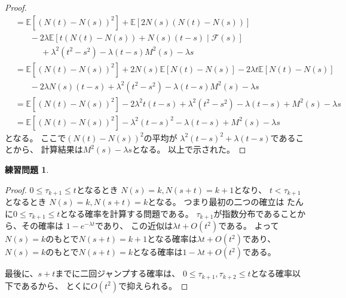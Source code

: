\documentclass[uplatex]{jsarticle}
\theoremstyle{definition}
\newtheorem{prob}[prob]{練習問題}
\def\E{\mathbb{E}}
\def\mcF{\mathcal{F}}
\begin{document}
\begin{proof}
\begin{align*}
    &= \E\left[ \left( N(t) - N(s)\right)^2\right]
    + \E\left[ 2N(s)\left( N(t) - N(s) \right)\right] \\
    &\ \ \ \ \ \ \ \
    - 2\lambda \E\left[ t(N(t)-N(s)) + N(s)(t-s) \middle| \mcF(s) \right] \\
    &\ \ \ \ \ \ \ \ \ \ \ \ \ \
    + \lambda^2(t^2-s^2) - \lambda (t-s) M^2(s) - \lambda s \\
    &= \E\left[ \left( N(t) - N(s)\right)^2\right]
    + 2N(s)\E\left[ N(t) - N(s) \right]
    - 2\lambda t\E\left[ N(t) - N(s) \right] \\
    &\ \ \ \ \ \ \ \
    - 2\lambda N(s)(t-s) + \lambda^2(t^2-s^2)
    - \lambda (t-s) M^2(s) - \lambda s \\
    &= \E\left[ \left( N(t) - N(s)\right)^2\right]
    - 2\lambda^2 t(t-s) + \lambda^2(t^2-s^2) - \lambda (t-s) + M^2(s) - \lambda s \\
    &= \E\left[ \left( N(t) - N(s)\right)^2\right]
    - \lambda^2(t-s)^2 - \lambda (t-s) + M^2(s) - \lambda s
  \end{align*}
  となる。
  ここで\(\left( N(t) - N(s)\right)^2\)の平均が
  \(\lambda^2(t-s)^2 + \lambda (t-s)\)であることから、
  計算結果は\(M^2(s)-\lambda s\)となる。
  以上で示された。
\end{proof}





















\begin{prob}\label{prob: 11.2}
\end{prob}

\begin{proof}
  \(0 \leq \tau_{k+1} \leq t\)となるとき
  \(N(s) = k, N(s+t) = k+1\)となり、
  \(t < \tau_{k+1}\)となるとき
  \(N(s) = k, N(s+t) = k\)となる。
  つまり最初の二つの確立は
  たんに\(0 \leq \tau_{k+1} \leq t\)となる確率を計算する問題である。
  \(\tau_{k+1}\)が指数分布であることから、その確率は
  \(1-e^{-\lambda t}\)であり、
  この近似は\(\lambda t + O(t^2)\)である。
  よって\(N(s)=k\)のもとで\(N(s+t)=k+1\)となる確率は\(\lambda t+O(t^2)\)であり、
  \(N(s) = k\)のもとで\(N(s+t) = k\)となる確率は\(1-\lambda t + O(t^2)\)である。

  最後に、\(s+t\)までに二回ジャンプする確率は、
  \(0\leq \tau_{k+1},\tau_{k+2} \leq t\)となる確率以下であるから、
  とくに\(O(t^2)\)で抑えられる。
\end{proof}
\end{document}
